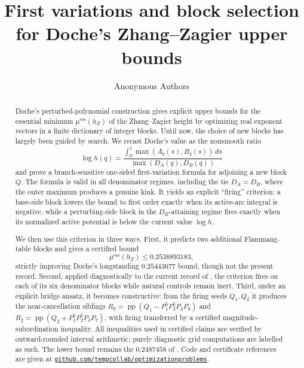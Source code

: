 \documentclass[11pt,reqno]{amsart}
\theoremstyle{plain}
\theoremstyle{definition}
\theoremstyle{remark}
\newcommand{\hZ}{h_Z}
\newcommand{\essmin}{\mu^{\mathrm{ess}}(\hZ)}
\DeclareMathOperator{\pp}{pp}
\newcommand{\repo}{\href{https://github.com/tempcollab/optimizationproblems/tree/main/constants/82a}{\texttt{github.com/tempcollab/optimizationproblems}}}
\begin{document}
\title[First variations for Zhang--Zagier upper bounds]
{First variations and block selection for Doche's Zhang--Zagier upper bounds}

\author{Anonymous Authors}




\date{}


\begin{abstract}
Doche's perturbed-polynomial construction gives explicit upper bounds for the
essential minimum $\essmin$ of the Zhang--Zagier height by optimizing real exponent
vectors in a finite dictionary of integer blocks.  Until now, the choice of new blocks
has largely been guided by search.  We recast Doche's value as the nonsmooth ratio
\[
  \log h(q)=\frac{\int_0^1\max(A_q(s),B_q(s))\,ds}{\max(D_A(q),D_B(q))}
\]
and prove a branch-sensitive one-sided first-variation formula for adjoining a new
block $Q$.  The formula is valid in all denominator regimes, including the tie
$D_A=D_B$, where the outer maximum produces a genuine kink.  It yields an explicit
``firing'' criterion: a base-side block lowers the bound to first order exactly when
its active-arc integral is negative, while a perturbing-side block in the
$D_B$-attaining regime fires exactly when its normalized active potential is below the
current value $\log h$.

We then use this criterion in three ways.  First, it predicts two additional
Flammang-table blocks and gives a certified bound
\[
  \essmin\le 0.2538893183,
\]
strictly improving Doche's longstanding $0.25443677$ bound, though not the present
record.  Second, applied diagnostically to the current record of \citet{Gri26}, the
criterion fires on each of its six denominator blocks while natural controls remain
inert.  Third, under an explicit bridge ansatz, it becomes constructive: from the
firing seeds $Q_1,Q_2$ it produces the near-cancellation siblings
$R_0=\pp(Q_1-P_1^5P_2^5P_4P_8)$ and
$R_2=\pp(Q_2+P_1^5P_2^5P_4P_7)$, with firing transferred by a certified
magnitude-subordination inequality.  All inequalities used in certified claims are
verified by outward-rounded interval arithmetic; purely diagnostic grid computations
are labelled as such.  The lower bound remains the $0.2487458$ of \citet{F18}.
Code and certificate references are given at \repo.
\end{abstract}
\end{document}
